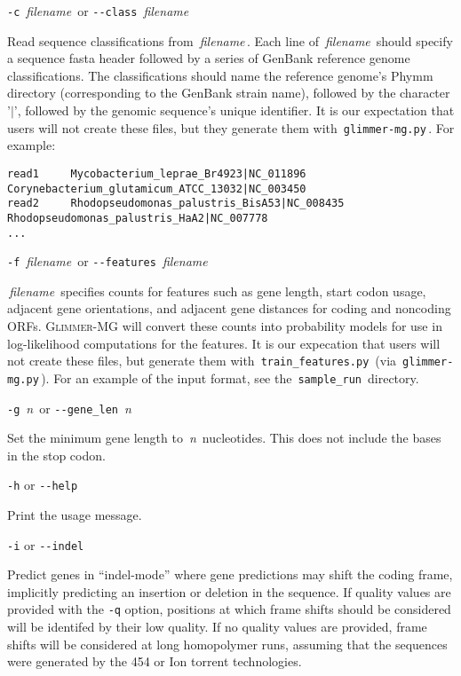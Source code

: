 \documentclass[fleqn,titlepage,11pt]{article}
\def\Desc#1{\,\mbox{\emph{#1}}\,}
\def\Gmg{\textsc{Glimmer-MG}}
\def\Pg#1{\texttt{#1}}
\begin{document}
\exdent
  \verb`-c` \Desc{filename} \enskip or \enskip \verb`--class` \Desc{filename}

  Read sequence classifications from \Desc{filename}. Each line of
  \Desc{filename} should specify a sequence fasta header followed by a
  series of GenBank reference genome classifications. The
  classifications should name the reference genome's Phymm directory
  (corresponding to the GenBank strain name), followed by the
  character '$|$', followed by the genomic sequence's unique
  identifier. It is our expectation that users will not create these
  files, but they generate them with \,\Pg{glimmer-mg.py}\,. For
  example:

\BSV
\footnotesize{
\begin{verbatim}
read1     Mycobacterium_leprae_Br4923|NC_011896 Corynebacterium_glutamicum_ATCC_13032|NC_003450
read2     Rhodopseudomonas_palustris_BisA53|NC_008435 Rhodopseudomonas_palustris_HaA2|NC_007778
...
\end{verbatim}
}
\ESV

\exdent
  \verb`-f` \Desc{filename} \enskip or \enskip \verb`--features` \Desc{filename}

  \Desc{filename} specifies counts for features such as gene length,
  start codon usage, adjacent gene orientations, and adjacent gene
  distances for coding and noncoding ORFs. \Gmg{} will convert these
  counts into probability models for use in log-likelihood
  computations for the features. It is our expecation that users will
  not create these files, but generate them with
  \,\Pg{train\_features.py}\, (via \,\Pg{glimmer-mg.py}\,). For an
  example of the input format, see the \,\Pg{sample\_run}\, directory.

\exdent
  \verb`-g` \Desc{n} \enskip or \enskip \verb`--gene_len` \Desc{n}

  Set the minimum gene length to \Desc{n} nucleotides.  This does not include
  the bases in the stop codon.

\exdent
  \verb`-h` \enskip or \enskip \verb`--help`

  Print the usage message.

\exdent
  \verb`-i` \enskip or \enskip \verb`--indel`

  Predict genes in ``indel-mode'' where gene predictions may shift the
  coding frame, implicitly predicting an insertion or deletion in the
  sequence. If quality values are provided with the \verb`-q` option,
  positions at which frame shifts should be considered will be
  identifed by their low quality. If no quality values are provided,
  frame shifts will be considered at long homopolymer runs, assuming
  that the sequences were generated by the 454 or Ion torrent
  technologies.
\end{document}
